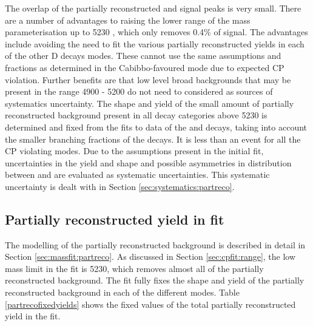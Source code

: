 The overlap of the partially reconstructed and signal peaks is very small. There are a number of advantages to raising the lower range of the mass parameterisation up to 5230 \mev, which only removes 0.4\% of signal. The advantages include avoiding the need to fit the various partially reconstructed yields in each of the other D decays modes. These cannot use the same assumptions and fractions as determined in the Cabibbo-favoured mode due to expected CP violation. Further benefits are that low level broad backgrounds that may be present in the range 4900 - 5200 \mev do not need to considered as sources of systematics uncertainty. The shape and yield of the small amount of partially reconstructed background present in all \D decay categories above 5230 \mev is determined and fixed from the fits to data of the \kpi and \kpipipi decays, taking into account the smaller branching fractions of the \D decays. It is less than an event for all the CP violating modes. Due to the assumptions present in the initial fit, uncertainties in the yield and shape and possible asymmetries in distribution between \Bp and \Bm are evaluated as systematic uncertainties. This systematic uncertainty is dealt with in Section \ref{sec:systematics:partreco}.

\subsection{Partially reconstructed yield in \CP fit}
\label{sec:cpfit:partrecoyields}

The modelling of the partially reconstructed background is described in detail in Section \ref{sec:massfit:partreco}. As discussed in Section \ref{sec:cpfit:range}, the low mass limit in the \CP fit is 5230\mevcc, which removes almost all of the partially reconstructed background. The \CP fit fully fixes the shape and yield of the partially reconstructed background in each of the different \Dz modes. Table \ref{partrecofixedyields} shows the fixed values of the total partially reconstructed yield in the \CP fit.


